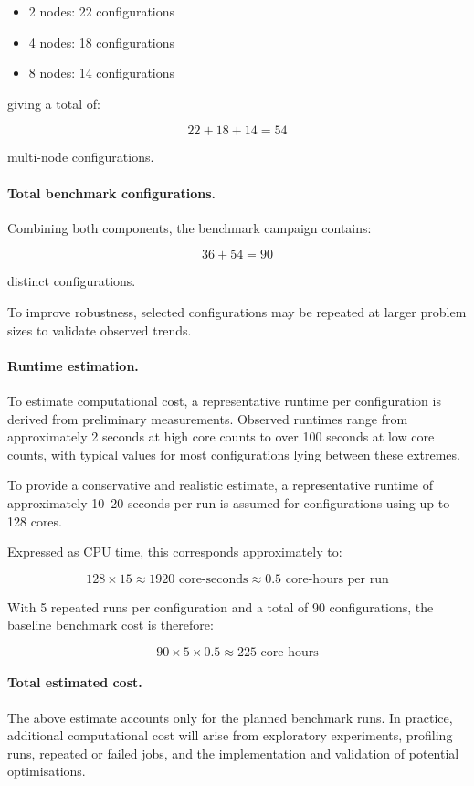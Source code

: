 \documentclass{article}
\begin{document}
\begin{itemize}
    \item 2 nodes: 22 configurations
    \item 4 nodes: 18 configurations
    \item 8 nodes: 14 configurations
\end{itemize}

giving a total of:

\[
22 + 18 + 14 = 54
\]

multi-node configurations.

\paragraph{Total benchmark configurations.}
Combining both components, the benchmark campaign contains:

\[
36 + 54 = 90
\]

distinct configurations.

To improve robustness, selected configurations may be repeated at larger problem sizes to validate observed trends. 

\paragraph{Runtime estimation.}
To estimate computational cost, a representative runtime per configuration is derived from preliminary measurements. 
Observed runtimes range from approximately 2 seconds at high core counts to over 100 seconds at low core counts, with typical values for most configurations lying between these extremes.

To provide a conservative and realistic estimate, a representative runtime of approximately 10--20 seconds per run is assumed for configurations using up to 128 cores.

Expressed as CPU time, this corresponds approximately to:

\[
128 \times 15 \approx 1920 \text{ core-seconds} \approx 0.5 \text{ core-hours per run}
\]


With 5 repeated runs per configuration and a total of 90 configurations, the baseline benchmark cost is therefore:

\[
90 \times 5 \times 0.5 \approx 225 \text{ core-hours}
\]

\paragraph{Total estimated cost.}
The above estimate accounts only for the planned benchmark runs. 
In practice, additional computational cost will arise from exploratory experiments, profiling runs, repeated or failed jobs, and the implementation and validation of potential optimisations.
\end{document}
